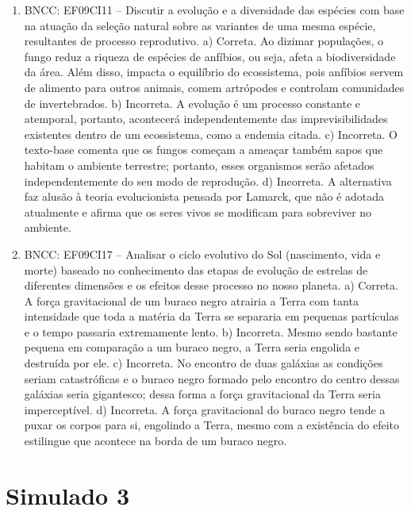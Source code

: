 \begin{enumerate}
\item
BNCC: EF09CI11 -- Discutir a evolução e a diversidade
das espécies com base na atuação da seleção natural sobre as variantes
de uma mesma espécie, resultantes de processo reprodutivo.
a) Correta. Ao dizimar populações, o fungo reduz a riqueza de espécies de anfíbios, ou seja, afeta a biodiversidade da área. Além disso, 
impacta o equilíbrio do ecossistema, pois anfíbios servem de alimento
para outros animais, comem artrópodes e controlam comunidades de invertebrados.
b) Incorreta. A evolução é um processo constante e atemporal, portanto, acontecerá independentemente das imprevisibilidades existentes
dentro de um ecossistema, como a endemia citada.
c) Incorreta. O texto-base comenta que os fungos começam a ameaçar também sapos que habitam o ambiente terrestre; portanto, esses organismos serão afetados independentemente do seu modo de reprodução.
d) Incorreta. A alternativa faz alusão à teoria evolucionista
pensada por Lamarck, que não é adotada atualmente e afirma que os seres
vivos se modificam para sobreviver no ambiente.

\item
BNCC: EF09CI17 -- Analisar o ciclo evolutivo do Sol
(nascimento, vida e morte) baseado no conhecimento das etapas de
evolução de estrelas de diferentes dimensões e os efeitos desse processo
no nosso planeta.
a)  Correta. A força gravitacional de um buraco negro atrairia a
  Terra com tanta intensidade que toda a matéria da Terra se separaria
  em pequenas partículas e o tempo passaria extremamente lento.
b)  Incorreta. Mesmo sendo bastante pequena em comparação a um buraco
  negro, a Terra seria engolida e destruída por ele.
c)  Incorreta. No encontro de duas galáxias as condições seriam
  catastróficas e o buraco negro formado pelo encontro do centro dessas
  galáxias seria gigantesco; dessa forma a força gravitacional da Terra seria imperceptível.
d) Incorreta. A força gravitacional do buraco negro tende a puxar os corpos para si, engolindo a Terra, mesmo com a existência do efeito
  estilingue que acontece na borda de um buraco negro.
\end{enumerate}

\section*{Simulado 3}

